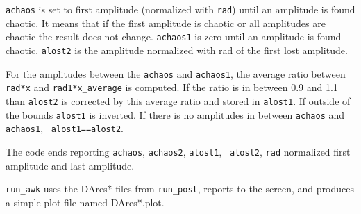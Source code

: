 \documentclass{article}    %
\begin{document}
{\tt achaos} is set to first amplitude (normalized with {\tt rad}) until an
amplitude is found chaotic. It means that if the first amplitude is
chaotic or all amplitudes are chaotic the result does not change.
{\tt achaos1} is zero until an amplitude is found chaotic.
{\tt alost2} is the amplitude normalized with rad of the first lost amplitude.

For the amplitudes between the {\tt achaos} and {\tt achaos1}, the average
ratio between {\tt rad*x} and {\tt rad1*x\_average} is computed. If the ratio
is in between 0.9 and 1.1 than {\tt alost2} is corrected by this average ratio
and stored in {\tt alost1}. If outside of the bounds {\tt alost1} is inverted.
If there is no amplitudes in between {\tt achaos} and {\tt achaos1}, {\tt
alost1==alost2}.


The code ends reporting {\tt achaos}, {\tt achaos2}, {\tt alost1}, {\tt
alost2}, {\tt rad} normalized first amplitude and last amplitude.

{\tt run\_awk} uses the DAres* files from {\tt run\_post}, reports to the
screen, and produces a simple plot file named DAres*.plot.
\end{document}
